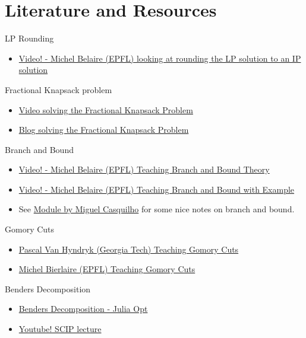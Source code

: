 \section{Literature and Resources}


\begin{resource}
LP Rounding
\begin{itemize}
\item  \href{https://youtu.be/Az7HUuq4SOI?t=189}{Video! - Michel Belaire (EPFL) looking at rounding the LP solution to an IP solution}
\end{itemize}

Fractional Knapsack problem
\begin{itemize}
\item \href{https://youtu.be/m1p-eWxrt6g}{Video solving the Fractional Knapsack Problem}
\item \href{https://www.geeksforgeeks.org/fractional-knapsack-problem/}{Blog solving the Fractional Knapsack Problem}
\end{itemize}

Branch and Bound
\begin{itemize}
\item \href{https://www.youtube.com/watch?v=SdXPNaID-T8}{Video! -  Michel Belaire (EPFL) Teaching Branch and Bound Theory}
\item \href{https://www.youtube.com/watch?v=nKXZYQUtvAY}{Video! -  Michel Belaire (EPFL) Teaching Branch and Bound with Example}
\item See \href{http://web.tecnico.ulisboa.pt/mcasquilho/compute/_linpro/TaylorB_module_c.pdf}{Module by Miguel Casquilho} for some nice notes on branch and bound.
\end{itemize}

Gomory Cuts
\begin{itemize}
\item \href{https://www.youtube.com/watch?v=1i0rKtH_YPs&list=PLNMgVqt8MREx6Nex1Q9003vrZem-JXNvX&index=28&ab_channel=EducationalDocumentaries}{Pascal Van Hyndryk (Georgia Tech) Teaching Gomory Cuts}
\item \href{https://www.youtube.com/watch?v=VdXHGNDnjjo}{Michel Bierlaire (EPFL) Teaching Gomory Cuts}
\end{itemize}

Benders Decomposition
\begin{itemize}
\item \href{https://www.juliaopt.org/notebooks/Shuvomoy%20-%20Benders%20decomposition.html}{Benders Decomposition - Julia Opt}
\item \href{https://www.youtube.com/watch?v=8vUNXHwVnC8}{Youtube!  SCIP lecture}
\end{itemize}
\end{resource}


%
